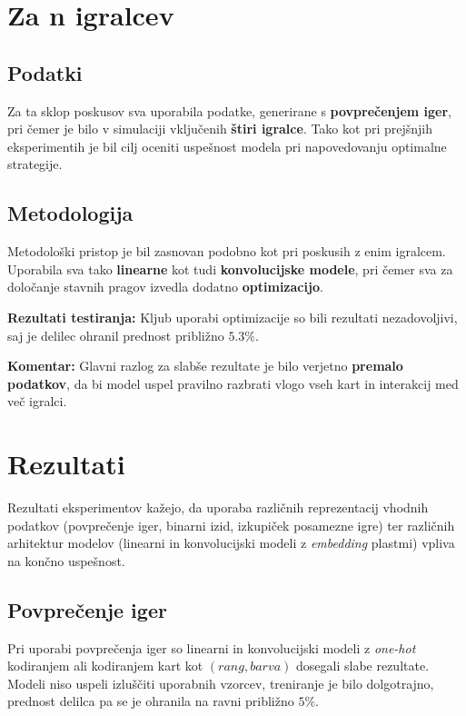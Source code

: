 \documentclass[a4paper,12pt]{article}
\begin{document}
\section{Za n igralcev}

\subsection{Podatki}
Za ta sklop poskusov sva uporabila podatke, generirane s \textbf{povprečenjem iger}, 
pri čemer je bilo v simulaciji vključenih \textbf{štiri igralce}. 
Tako kot pri prejšnjih eksperimentih je bil cilj oceniti uspešnost modela pri napovedovanju optimalne strategije.

\subsection{Metodologija}
Metodološki pristop je bil zasnovan podobno kot pri poskusih z enim igralcem. 
Uporabila sva tako \textbf{linearne} kot tudi \textbf{konvolucijske modele}, 
pri čemer sva za določanje stavnih pragov izvedla dodatno \textbf{optimizacijo}. 

\textbf{Rezultati testiranja:} 
Kljub uporabi optimizacije so bili rezultati nezadovoljivi, saj je delilec ohranil 
prednost približno $5.3\%$. 

\textbf{Komentar:} 
Glavni razlog za slabše rezultate je bilo verjetno \textbf{premalo podatkov}, 
da bi model uspel pravilno razbrati vlogo vseh kart in interakcij med več igralci.

\section{Rezultati}

Rezultati eksperimentov kažejo, da uporaba različnih reprezentacij vhodnih podatkov 
(povprečenje iger, binarni izid, izkupiček posamezne igre) ter različnih arhitektur modelov 
(linearni in konvolucijski modeli z \textit{embedding} plastmi) vpliva na končno uspešnost.

\subsection*{Povprečenje iger}
Pri uporabi povprečenja iger so linearni in konvolucijski modeli z \textit{one-hot} 
kodiranjem ali kodiranjem kart kot $(rang, barva)$ dosegali slabe rezultate. 
Modeli niso uspeli izluščiti uporabnih vzorcev, treniranje je bilo dolgotrajno, 
prednost delilca pa se je ohranila na ravni približno $5\%$.
\end{document}
